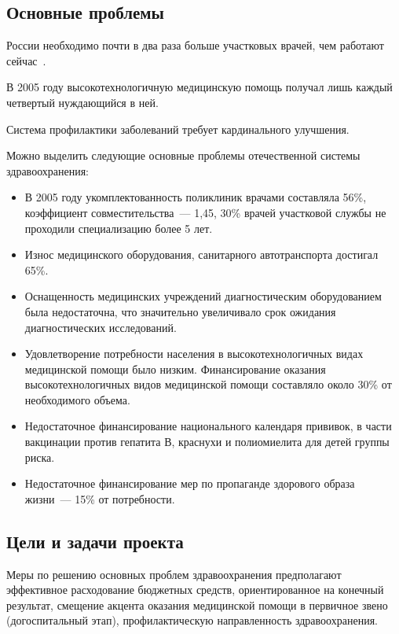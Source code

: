 \documentclass[article, 12pt, russian, oneside]{ncc}
\begin{document}
\subsection{Основные проблемы}

России необходимо почти в два раза больше участковых врачей, чем
работают сейчас~\cite{Health_Problems}.

В 2005 году высокотехнологичную медицинскую помощь получал лишь каждый
четвертый нуждающийся в ней.

Система профилактики заболеваний требует кардинального улучшения.

Можно выделить следующие основные проблемы отечественной системы
здравоохранения:

\begin{itemize}
\item В 2005 году укомплектованность поликлиник врачами составляла
  56\%, коэффициент совместительства~--- 1,45, 30\% врачей участковой
  службы не проходили специализацию более 5 лет.
\item Износ медицинского оборудования, санитарного автотранспорта
  достигал 65\%.
\item Оснащенность медицинских учреждений диагностическим
  оборудованием была недостаточна, что значительно увеличивало срок
  ожидания диагностических исследований.
\item Удовлетворение потребности населения в высокотехнологичных видах
  медицинской помощи было низким. Финансирование оказания
  высокотехнологичных видов медицинской помощи составляло около 30\%
  от необходимого объема.
\item Недостаточное финансирование национального календаря прививок, в
  части вакцинации против гепатита В, краснухи и полиомиелита для
  детей группы риска.
\item Недостаточное финансирование мер по пропаганде здорового образа
  жизни~--- 15\% от потребности.
\end{itemize}

\subsection{Цели и задачи проекта}

Меры по решению основных проблем здравоохранения предполагают
эффективное расходование бюджетных средств, ориентированное на
конечный результат, смещение акцента оказания медицинской помощи в
первичное звено (догоспитальный этап), профилактическую направленность
здравоохранения.
\end{document}
